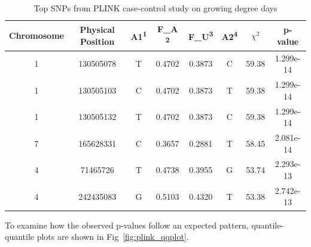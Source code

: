\documentclass{article}
\begin{document}
\begin{table}[!h]
\centering
\begin{tabular}{|c|c|c|c|c|c|c|c|}
\hline
Chromosome & Physical Position & A1\textsuperscript{1} & F\_A \textsuperscript{2} & F\_U\textsuperscript{3} & A2\textsuperscript{4} & ${\chi}^2$ & p-value \\ [.5ex]
\hline
1 & 130505078 & T & 0.4702 & 0.3873 & C & 59.38 & 1.299e-14 \\
\hline
1 & 130505103 & C & 0.4702 & 0.3873 & T & 59.38 & 1.299e-14 \\
\hline
1 & 130505132 & T & 0.4702 & 0.3873 & C & 59.38 & 1.299e-14 \\
\hline
7 & 165628331 & C & 0.3657&  0.2881 & T & 58.45 & 2.081e-14 \\
\hline
4 &  71465726 & T & 0.4738 & 0.3955 & G & 53.74 & 2.293e-13 \\
\hline
4 & 242435083 & G & 0.5103 & 0.4320 & T & 53.38 & 2.742e-13 \\
\hline
\end{tabular}
\caption{Top SNPs from PLINK case-control study on growing degree days}
\label{table:cc_gdd}
\end{table}

To examine how the observed p-values follow an expected pattern, quantile-quantile plots are shown in Fig~\ref{fig:plink_qqplot}.
\end{document}
